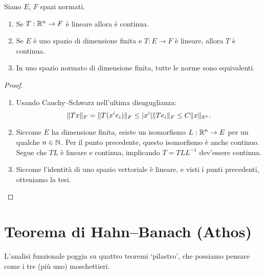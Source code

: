 \begin{lemma}
	Siano $E$, $F$ spazi normati.
	\begin{enumerate}
		\item Se $T : \mathbb{R}^n \to F$ è lineare allora è continua.
		\item Se $E$ è uno spazio di dimensione finita e $T : E \to F$ è lineare, allora $T$ è continua.
		\item In uno spazio normato di dimensione finita, tutte le norme sono equivalenti.
	\end{enumerate}
\end{lemma}
\begin{proof}
	\leavevmode
	\begin{enumerate}
		\item Usando Cauchy--Schwarz nell'ultima disuguglianza:
		\begin{equation*}
			\|Tx\|_F = \|T(x^i e_i)\|_F \leq |x^i|\|Te_i\|_F \leq C \|x\|_{\mathbb{R}^n}.
		\end{equation*}
		\item Siccome $E$ ha dimensione finita, esiste un isomorfismo $L:\mathbb{R}^n \to E$ per un qualche $n \in \mathbb{N}$. Per il punto precedente, questo isomorfismo è anche continuo. Segue che $TL$ è lineare e continua, implicando $T = TLL^{-1}$ dev'essere continua.
		\item Siccome l'identità di uno spazio vettoriale è lineare, e visti i punti precedenti, otteniamo la tesi.
	\end{enumerate}
\end{proof}

\section{Teorema di Hahn--Banach (Athos)}
L'analisi funzionale poggia su quattro teoremi `pilastro', che possiamo pensare come i tre (più uno) moschettieri.

